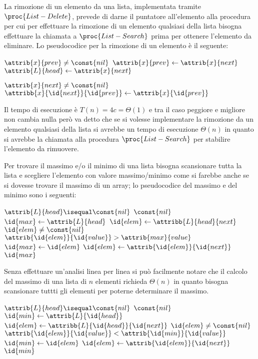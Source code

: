 La rimozione di un elemento da una lista, implementata tramite $\proc{List-Delete}$,
prevede di darne il puntatore all'elemento alla procedura per cui per effettuare
la rimozione di un elemento qualsiasi della lista bisogna effettuare la chiamata
a $\proc{List-Search}$ prima per ottenere l'elemento da eliminare.
Lo pseudocodice per la rimozione di un elemento è il seguente:
\begin{codebox}
\li \If $\attrib{x}{prev} \neq \const{nil}$
    \Then
\li              $\attrib{x}{prev} \gets \attrib{x}{next}$
    \End
\li \Else        $\attrib{L}{head} \gets \attrib{x}{next}$

\li \If $\attrib{x}{next} \neq \const{nil}$
    \Then
\li              $\attribb{x}{\id{next}}{\id{prev}} \gets \attrib{x}{\id{prev}}$
    \End
\end{codebox}
Il tempo di esecuzione è $T(n) = 4c = \Theta(1)$ e tra il caso peggiore e migliore non cambia
nulla però va detto che se si volesse implementare la rimozione da un elemento qualsiasi
della lista si avrebbe un tempo di esecuzione $\Theta(n)$ in quanto si avrebbe la chiamata
alla procedura $\proc{List-Search}$ per stabilire l'elemento da rimuovere.

Per trovare il massimo e/o il minimo di una lista bisogna scansionare tutta la lista
e scegliere l'elemento con valore massimo/minimo come si farebbe anche se si dovesse
trovare il massimo di un array; lo pseudocodice del massimo e del minimo sono i seguenti:
\begin{codebox}
\li \If $\attrib{L}{head} \isequal \const{nil}$
    \Then
\li                \Return $\const{nil}$
\li $\id{max} \gets \attrib{L}{head}$
\li $\id{elem} \gets \attribb{L}{head}{next}$
\li \While $\id{elem} \neq \const{nil}$
    \Do
\li                 \If $\attrib{\id{elem}}{\id{value}} > \attrib{max}{value}$
                    \Then
\li                              $\id{max} \gets \id{elem}$
                    \End
\li                 $\id{elem} \gets \attrib{\id{elem}}{\id{next}}$
    \End
\li \Return $\id{max}$
\end{codebox}
Senza effettuare un'analisi linea per linea si può facilmente notare che il calcolo
del massimo di una lista di $n$ elementi richieda $\Theta(n)$ in quanto bisogna
scansionare tuttti gli elementi per poterne determinare il massimo.

\begin{codebox}
\li \If $\attrib{L}{head} \isequal \const{nil}$
    \Then
\li                \Return $\const{nil}$
\li $\id{min} \gets \attrib{L}{\id{head}}$
\li $\id{elem} \gets \attribb{L}{\id{head}}{\id{next}}$
\li \While $\id{elem} \neq \const{nil}$
    \Do
\li                 \If $\attrib{\id{elem}}{\id{value}} < \attrib{\id{min}}{\id{value}}$
                    \Then
\li                              $\id{min} \gets \id{elem}$
                    \End
\li                 $\id{elem} \gets \attrib{\id{elem}}{\id{next}}$
    \End
\li \Return $\id{min}$
\end{codebox}


